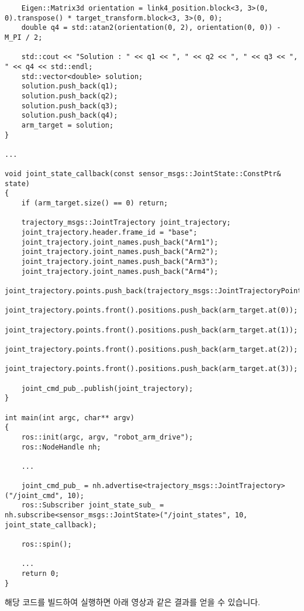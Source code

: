 \documentclass{article}
\begin{document}
\begin{verbatim}
	Eigen::Matrix3d orientation = link4_position.block<3, 3>(0, 0).transpose() * target_transform.block<3, 3>(0, 0);
	double q4 = std::atan2(orientation(0, 2), orientation(0, 0)) - M_PI / 2;
	  
	std::cout << "Solution : " << q1 << ", " << q2 << ", " << q3 << ", " << q4 << std::endl;
	std::vector<double> solution;
	solution.push_back(q1);
	solution.push_back(q2);
	solution.push_back(q3);
	solution.push_back(q4);
	arm_target = solution;
}

...

void joint_state_callback(const sensor_msgs::JointState::ConstPtr& state)
{
	if (arm_target.size() == 0) return;
	  
	trajectory_msgs::JointTrajectory joint_trajectory;
	joint_trajectory.header.frame_id = "base";
	joint_trajectory.joint_names.push_back("Arm1");
	joint_trajectory.joint_names.push_back("Arm2");
	joint_trajectory.joint_names.push_back("Arm3");
	joint_trajectory.joint_names.push_back("Arm4");
	joint_trajectory.points.push_back(trajectory_msgs::JointTrajectoryPoint());
	joint_trajectory.points.front().positions.push_back(arm_target.at(0));
	joint_trajectory.points.front().positions.push_back(arm_target.at(1));
	joint_trajectory.points.front().positions.push_back(arm_target.at(2));
	joint_trajectory.points.front().positions.push_back(arm_target.at(3));
	  
	joint_cmd_pub_.publish(joint_trajectory);
}

int main(int argc, char** argv)
{
	ros::init(argc, argv, "robot_arm_drive");
	ros::NodeHandle nh;

	...

	joint_cmd_pub_ = nh.advertise<trajectory_msgs::JointTrajectory>("/joint_cmd", 10);
	ros::Subscriber joint_state_sub_ = nh.subscribe<sensor_msgs::JointState>("/joint_states", 10, joint_state_callback);
	  
	ros::spin();
	
	...
	return 0;
}
\end{verbatim}

해당 코드를 빌드하여 실행하면 아래 영상과 같은 결과를 얻을 수 있습니다.
\end{document}

